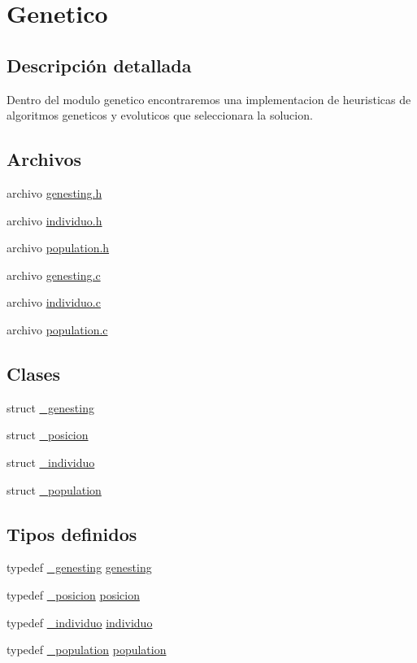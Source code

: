 \hypertarget{group__genetic}{
\section{Genetico}
\label{group__genetic}
}


\subsection{Descripci\'{o}n detallada}
Dentro del modulo genetico encontraremos una implementacion de heuristicas de algoritmos geneticos y evoluticos que seleccionara la solucion. 

\subsection*{Archivos}
\begin{CompactItemize}
\item 
archivo \hyperlink{genesting_8h}{genesting.h}
\item 
archivo \hyperlink{individuo_8h}{individuo.h}
\item 
archivo \hyperlink{population_8h}{population.h}
\item 
archivo \hyperlink{genesting_8c}{genesting.c}
\item 
archivo \hyperlink{individuo_8c}{individuo.c}
\item 
archivo \hyperlink{population_8c}{population.c}
\end{CompactItemize}
\subsection*{Clases}
\begin{CompactItemize}
\item 
struct \hyperlink{struct__genesting}{\_\-genesting}
\item 
struct \hyperlink{struct__posicion}{\_\-posicion}
\item 
struct \hyperlink{struct__individuo}{\_\-individuo}
\item 
struct \hyperlink{struct__population}{\_\-population}
\end{CompactItemize}
\subsection*{Tipos definidos}
\begin{CompactItemize}
\item 
typedef \hyperlink{struct__genesting}{\_\-genesting} \hyperlink{group__genetic_gcd77cefe71c44c38745a4f148c7a69eb_gcd77cefe71c44c38745a4f148c7a69eb}{genesting}
\item 
typedef \hyperlink{struct__posicion}{\_\-posicion} \hyperlink{group__genetic_ge2fa8f912ec24aab702abf9b76489462_ge2fa8f912ec24aab702abf9b76489462}{posicion}
\item 
typedef \hyperlink{struct__individuo}{\_\-individuo} \hyperlink{group__genetic_g86fcc12a3e2577bedca3b8364e722da3_g86fcc12a3e2577bedca3b8364e722da3}{individuo}
\item 
typedef \hyperlink{struct__population}{\_\-population} \hyperlink{group__genetic_gdc93697b2d7197da72db59932b540a07_gdc93697b2d7197da72db59932b540a07}{population}
\end{CompactItemize}
